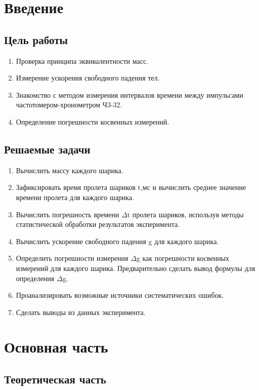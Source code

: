 

\section{Введение}
\subsection{Цель работы}
\begin{enumerate}
    \item Проверка принципа эквивалентности масс.
    \item Измерение ускорения свободного падения тел.
    \item Знакомство с методом измерения интервалов времени между импульсами частотомером-хронометром Ч3-32.
    \item Определение погрешности косвенных измерений.
\end{enumerate}
\subsection{Решаемые задачи}
\begin{enumerate}
    \item Вычислить массу каждого шарика.
    \item Зафиксировать время пролета шариков t,мс и вычислить среднее значение времени пролета для каждого шарика.
    \item Вычислить погрешность времени $\Delta$t пролета шариков, используя методы статистической обработки результатов эксперимента.
    \item Вычислить ускорение свободного падения g для каждого шарика.
    \item Определить погрешности измерения $\Delta$g как погрешности косвенных измерений для каждого шарика. Предварительно сделать вывод формулы для определения $\Delta$g.
    \item Проанализировать возможные источники систематических ошибок.
    \item Сделать выводы из данных эксперимента.
\end{enumerate}

\section{Основная часть}

\subsection{Теоретическая часть}

